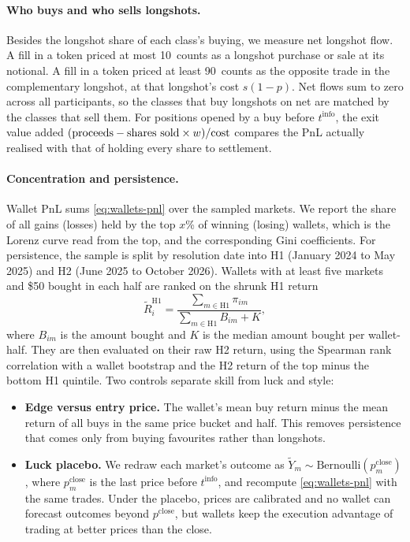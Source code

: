 \paragraph{Who buys and who sells longshots.}
Besides the longshot share of each class's buying, we measure net longshot flow. A fill in a token
priced at most 10\cents\ counts as a longshot purchase or sale at its notional. A fill in a token
priced at least 90\cents\ counts as the opposite trade in the complementary longshot, at that
longshot's cost $s(1-p)$. Net flows sum to zero across all participants, so the classes that buy
longshots on net are matched by the classes that sell them. For positions opened by a buy before
$t^{\mathrm{info}}$, the exit value added
$(\text{proceeds}-\text{shares sold}\times w)/\text{cost}$ compares the PnL actually realised
with that of holding every share to settlement.

\paragraph{Concentration and persistence.}
Wallet PnL sums \eqref{eq:wallets-pnl} over the sampled markets. We report the share of all gains (losses)
held by the top $x$\% of winning (losing) wallets, which is the Lorenz curve read from the top, and the
corresponding Gini coefficients. For persistence,
the sample is split by resolution date into H1 (January 2024 to May 2025) and H2 (June 2025 to
October 2026). Wallets with at least five markets and \$50 bought in each half are ranked on the
shrunk H1 return
\begin{equation}\label{eq:wallets-shrink}
  \tilde R_i^{\mathrm{H1}}=\frac{\sum_{m\in\mathrm{H1}}\pi_{im}}{\sum_{m\in\mathrm{H1}}B_{im}+K},
\end{equation}
where $B_{im}$ is the amount bought and $K$ is the median amount bought per wallet-half. They are
then evaluated on their raw H2 return, using the Spearman rank correlation with a wallet bootstrap and
the H2 return of the top minus the bottom H1 quintile. Two controls separate skill from luck and style:
\begin{itemize}
  \item \textbf{Edge versus entry price.} The wallet's mean buy return minus the mean return of all
    buys in the same price bucket and half. This removes persistence that comes only from buying
    favourites rather than longshots.
  \item \textbf{Luck placebo.} We redraw each market's outcome as
    $\tilde Y_m\sim\text{Bernoulli}(p_m^{\mathrm{close}})$, where $p_m^{\mathrm{close}}$ is the last
    price before $t^{\mathrm{info}}$, and recompute \eqref{eq:wallets-pnl} with the same trades.
    Under the placebo, prices are calibrated and no wallet can forecast outcomes beyond
    $p^{\mathrm{close}}$, but wallets keep the execution advantage of trading at better prices than
    the close.
\end{itemize}

